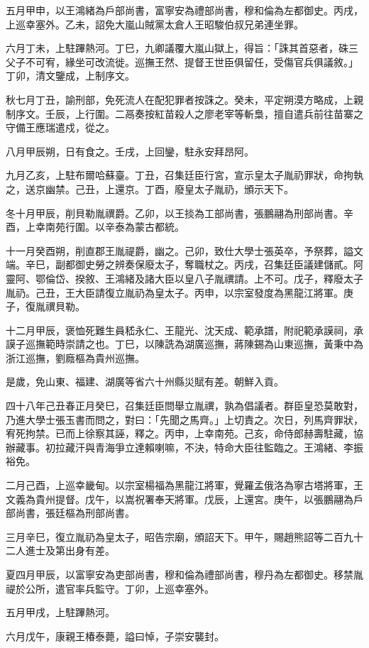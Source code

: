 \begin{pinyinscope}
五月甲申，以王鴻緒為戶部尚書，富寧安為禮部尚書，穆和倫為左都御史。丙戌，上巡幸塞外。乙未，詔免大嵐山賊黨太倉人王昭駿伯叔兄弟連坐罪。

六月丁未，上駐蹕熱河。丁巳，九卿議覆大嵐山獄上，得旨：「誅其首惡者，硃三父子不可宥，緣坐可改流徙。巡撫王然、提督王世臣俱留任，受傷官兵俱議敘。」丁卯，清文鑒成，上制序文。

秋七月丁丑，諭刑部，免死流人在配犯罪者按誅之。癸未，平定朔漠方略成，上親制序文。壬辰，上行圍。二鬲奏按紅苗殺人之廖老宰等斬梟，擅自遣兵前往苗寨之守備王應瑞遣戍，從之。

八月甲辰朔，日有食之。壬戌，上回鑾，駐永安拜昂阿。

九月乙亥，上駐布爾哈蘇臺。丁丑，召集廷臣行宮，宣示皇太子胤礽罪狀，命拘執之，送京幽禁。己丑，上還京。丁酉，廢皇太子胤礽，頒示天下。

冬十月甲辰，削貝勒胤禩爵。乙卯，以王掞為工部尚書，張鵬翮為刑部尚書。辛酉，上幸南苑行圍。以辛泰為蒙古都統。

十一月癸酉朔，削直郡王胤禔爵，幽之。己卯，致仕大學士張英卒，予祭葬，謚文端。辛巳，副都御史勞之辨奏保廢太子，奪職杖之。丙戌，召集廷臣議建儲貳。阿靈阿、鄂倫岱、揆敘、王鴻緒及諸大臣以皇八子胤禩請。上不可。戊子，釋廢太子胤礽。己丑，王大臣請復立胤礽為皇太子。丙申，以宗室發度為黑龍江將軍。庚子，復胤禩貝勒。

十二月甲辰，褒恤死難生員嵇永仁、王龍光、沈天成、範承譜，附祀範承謨祠，承謨子巡撫範時崇請之也。丁巳，以陳詵為湖廣巡撫，蔣陳錫為山東巡撫，黃秉中為浙江巡撫，劉廕樞為貴州巡撫。

是歲，免山東、福建、湖廣等省六十州縣災賦有差。朝鮮入貢。

四十八年己丑春正月癸巳，召集廷臣問舉立胤禩，孰為倡議者。群臣皇恐莫敢對，乃進大學士張玉書而問之，對曰：「先聞之馬齊。」上切責之。次日，列馬齊罪狀，宥死拘禁。已而上徐察其誣，釋之。丙申，上幸南苑。己亥，命侍郎赫壽駐藏，協辦藏事。初拉藏汗與青海爭立達賴喇嘛，不決，特命大臣往監臨之。王鴻緒、李振裕免。

二月己酉，上巡幸畿甸。以宗室楊福為黑龍江將軍，覺羅孟俄洛為寧古塔將軍，王文義為貴州提督。戊午，以嵩祝署奉天將軍。戊辰，上還宮。庚午，以張鵬翮為戶部尚書，張廷樞為刑部尚書。

三月辛巳，復立胤礽為皇太子，昭告宗廟，頒詔天下。甲午，賜趙熊詔等二百九十二人進士及第出身有差。

夏四月甲辰，以富寧安為吏部尚書，穆和倫為禮部尚書，穆丹為左都御史。移禁胤禔於公所，遣官率兵監守。丁卯，上巡幸塞外。

五月甲戌，上駐蹕熱河。

六月戊午，康親王椿泰薨，謚曰悼，子崇安襲封。


\end{pinyinscope}

